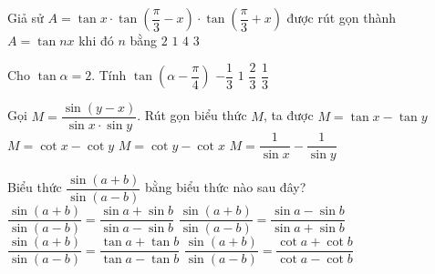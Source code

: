 \begin{ex}%
	Giả sử $A=\tan x\cdot \tan\left(\dfrac{\pi}{3}-x\right)\cdot \tan\left(\dfrac{\pi}{3}+x\right)$ được rút gọn  thành $A=\tan nx$ khi đó $n$ bằng
	\choice 
		 {$ 2$}
		{$ 1$} 
		{$ 4$} 
		{\True $  3$}
\end{ex}

\begin{ex}%
	Cho $\tan \alpha=2$. Tính $\tan  \left(\alpha-\dfrac{\pi}{4}\right)$
	 \choice
		{$-\dfrac{1}{3}$} 
		 {$1$ }
		{$\dfrac{2}{3}$} 
		{\True $\dfrac{1}{3}$} 
\end{ex}

\begin{ex}%
	Gọi $M = \dfrac{\sin(y - x)}{\sin x \cdot \sin y}$. Rút gọn biểu thức $M$, ta  được
	 \choice
		{$M = \tan x - \tan  y$}
		 {\True $M = \cot x - \cot y$}
		{$M = \cot  y - \cot x$}
		{$M = \dfrac{1}{\sin x} - \dfrac{1}{\sin y}$} 
\end{ex}

\begin{ex}%
	Biểu thức $\dfrac{\sin (a+b)}{\sin (a-b)}$ bằng biểu thức nào  sau đây?
	\choice 
		{$\dfrac{\sin (a+b)}{\sin (a-b)}=\dfrac{\sin a+\sin  b}{\sin a-\sin b}$}
		{$\dfrac{\sin (a+b)}{\sin (a-b)}=\dfrac{\sin a-\sin b}{\sin  a+\sin b}$}
		 {\True $\dfrac{\sin (a+b)}{\sin (a-b)}=\dfrac{\tan a+\tan b}{\tan a-\tan b}$}
		{$\dfrac{\sin (a+b)}{\sin (a-b)}=\dfrac{\cot a+\cot b}{\cot  a-\cot b}$}
\end{ex}

